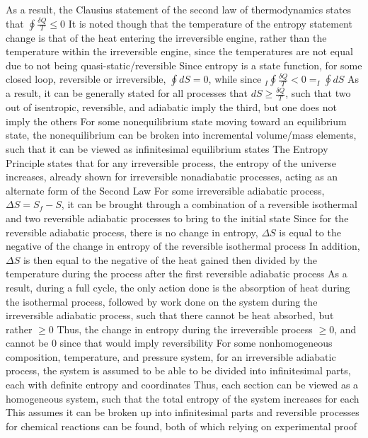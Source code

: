 \begin{outline*}
\2 As a result, the Clausius statement of the second law of thermodynamics states that $\oint \frac{\delta Q}{T} \leq 0$
\3 It is noted though that the temperature of the entropy statement change is that of the heat entering the irreversible engine, rather than the temperature within the irreversible engine, since the temperatures are not equal due to not being quasi-static/reversible
\1 Since entropy is a state function, for some closed loop, reversible or irreversible, $\oint dS = 0$, while since $_I\oint \frac{\delta Q}{T} < 0 = _I\oint dS$
\2 As a result, it can be generally stated for all processes that $dS \geq \frac{\delta Q}{T}$, such that two out of isentropic, reversible, and adiabatic imply the third, but one does not imply the others
\1 For some nonequilibrium state moving toward an equilibrium state, the nonequilibrium can be broken into incremental volume/mass elements, such that it can be viewed as infinitesimal equilibrium states 
\1 The Entropy Principle states that for any irreversible process, the entropy of the universe increases, already shown for irreversible nonadiabatic processes, acting as an alternate form of the Second Law
\2 For some irreversible adiabatic process, $\Delta S = S_f - S$, it can be brought through a combination of a reversible isothermal and two reversible adiabatic processes to bring to the initial state
\3 Since for the reversible adiabatic process, there is no change in entropy, $\Delta S$ is equal to the negative of the change in entropy of the reversible isothermal process
\3 In addition, $\Delta S$ is then equal to the negative of the heat gained then divided by the temperature during the process after the first reversible adiabatic process
\3 As a result, during a full cycle, the only action done is the absorption of heat during the isothermal process, followed by work done on the system during the irreversible adiabatic process, such that there cannot be heat absorbed, but rather $\geq 0$
\3 Thus, the change in entropy during the irreversible process $\geq 0$, and cannot be 0 since that would imply reversibility
\2 For some nonhomogeneous composition, temperature, and pressure system, for an irreversible adiabatic process, the system is assumed to be able to be divided into infinitesimal parts, each with definite entropy and coordinates
\3 Thus, each section can be viewed as a homogeneous system, such that the total entropy of the system increases for each
\3 This assumes it can be broken up into infinitesimal parts and reversible processes for chemical reactions can be found, both of which relying on experimental proof

\end{outline*}
